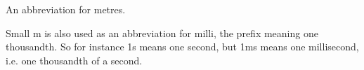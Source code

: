 An abbreviation for metres.
\par
Small m is also used as an abbreviation for milli, the prefix
meaning one thousandth. So for instance 1s means one second,
but 1ms means one millisecond, i.e. one thousandth of a second.